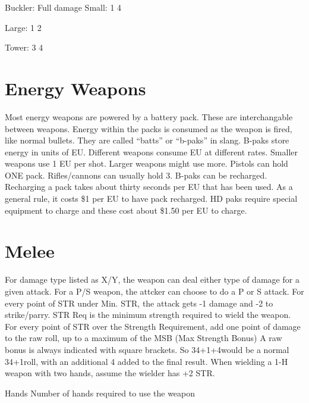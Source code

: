 \documentclass[twoside]{book}
\begin{document}
                    Buckler: Full damage   
                    Small:  1  4
                   
                    
                    Large:  1  2
                   
                    
                    Tower:  3  4
                   
                    
                  
                
            
\section{Energy Weapons}
      Most energy weapons are powered by a battery pack.
             These are interchangable between weapons. Energy within the
             packs is consumed as the weapon is fired, like normal
             bullets. They are called “batts” or
             “b-paks” in slang. B-paks store energy in units
             of EU. Different weapons consume EU at different rates.
             Smaller weapons use 1 EU per shot. Larger weapons might use
             more. Pistols can hold ONE pack. Rifles/cannons can usually
             hold 3. B-paks can be recharged. Recharging a pack takes
             about thirty seconds per EU that has been used. As a general
             rule, it costs \$1 per EU to have pack recharged. HD paks
             require special equipment to charge and these cost about
             \$1.50 per EU to charge. 
\section{Melee}
      For damage type listed as X/Y, the weapon can deal
             either type of damage for a given attack. For a P/S weapon,
             the attcker can choose to do a P or S attack. For every
             point of STR under Min. STR, the attack gets -1 damage and
             -2 to strike/parry. STR Req is the minimum strength required
             to wield the weapon. For every point of STR over the
             Strength Requirement, add one point of damage to the raw
             roll, up to a maximum of the MSB (Max Strength Bonus) A raw
             bonus is always indicated with square brackets. So 34+1+4would be a normal 34+1roll, with an additional 4
             added to the final result. When wielding a 1-H weapon with
             two hands, assume the wielder has +2 STR.   
            
                Hands   Number of hands
                required to use the weapon
              
\end{document}
